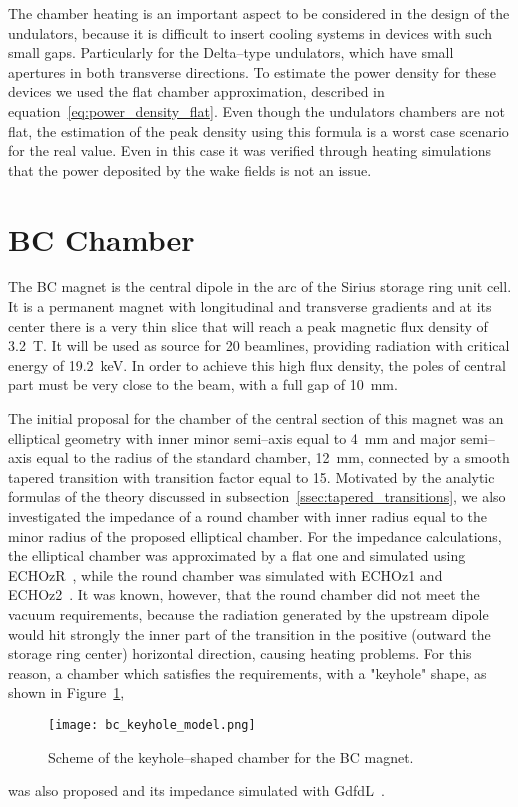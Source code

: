     The chamber heating is an important aspect to be considered in the design of the undulators, because it is difficult to insert cooling systems in devices with such small gaps. Particularly for the Delta--type undulators, which have small apertures in both transverse directions. To estimate the power density for these devices we used the flat chamber approximation, described in equation~\eqref{eq:power_density_flat}. Even though the undulators chambers are not flat, the estimation of the peak density using this formula is a worst case scenario for the real value. Even in this case it was verified through heating simulations that the power deposited by the wake fields is not an issue.

\section{BC Chamber}\label{sec:bc_chamber}

    The BC magnet is the central dipole in the arc of the Sirius storage ring unit cell. It is a permanent magnet with longitudinal and transverse gradients and at its center there is a very thin slice that will reach a peak magnetic flux density of \SI{3.2}{\tesla}. It will be used as source for 20 beamlines, providing radiation with critical energy of \SI{19.2}{\kilo\electronvolt}. In order to achieve this high flux density, the poles of central part must be very close to the beam, with a full gap of \SI{10}{\milli\meter}.

    The initial proposal for the chamber of the central section of this magnet was an elliptical geometry with inner minor semi--axis equal to \SI{4}{\milli\meter} and major semi--axis equal to the radius of the standard chamber, \SI{12}{\milli\meter}, connected by a smooth tapered transition with transition factor equal to 15. Motivated by the analytic formulas of the theory discussed in subsection~\ref{ssec:tapered_transitions}, we also investigated the impedance of a round chamber with inner radius equal to the minor radius of the proposed elliptical chamber. For the impedance calculations, the elliptical chamber was approximated by a flat one and simulated using ECHOzR~\cite{Zagorodnov2015}, while the round chamber was simulated with ECHOz1 and ECHOz2~\cite{Zagorodnov2005}. It was known, however, that the round chamber did not meet the vacuum requirements, because the radiation generated by the upstream dipole would hit strongly the inner part of the transition in the positive (outward the storage ring center) horizontal direction, causing heating problems. For this reason, a chamber which satisfies the requirements, with a "keyhole" shape, as shown in Figure~\ref{fig:bc_keyhole_model},
    \begin{figure}
        \centering
        \texttt{[image: bc\_keyhole\_model.png]}
        \caption{Scheme of the keyhole--shaped chamber for the BC magnet.}
        \label{fig:bc_keyhole_model}
    \end{figure}
    was also proposed and its impedance simulated with GdfdL~\cite{Bruns2017}.

